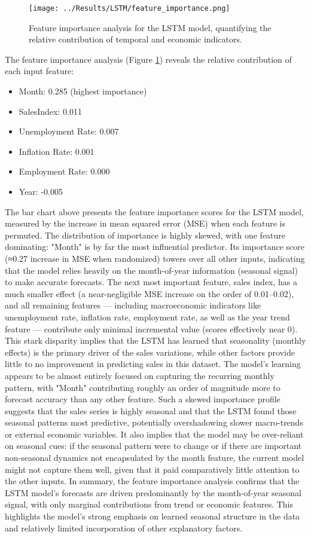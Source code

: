 \documentclass[12pt,a4paper]{report}
\begin{document}
\begin{figure}[htbp]
\centering
\texttt{[image: ../Results/LSTM/feature\_importance.png]}
\caption{Feature importance analysis for the LSTM model, quantifying the relative contribution of temporal and economic indicators.}
\label{fig:feature_importance}
\end{figure}

The feature importance analysis (Figure \ref{fig:feature_importance}) reveals the relative contribution of each input feature:
\begin{itemize}
    \item Month: 0.285 (highest importance)
    \item SalesIndex: 0.011
    \item Unemployment Rate: 0.007
    \item Inflation Rate: 0.001
    \item Employment Rate: 0.000
    \item Year: -0.005
\end{itemize}

The bar chart above presents the feature importance scores for the LSTM model, measured by the increase in mean squared error (MSE) when each feature is permuted. The distribution of importance is highly skewed, with one feature dominating: "Month" is by far the most influential predictor. Its importance score (≈0.27 increase in MSE when randomized) towers over all other inputs, indicating that the model relies heavily on the month-of-year information (seasonal signal) to make accurate forecasts. The next most important feature, sales index, has a much smaller effect (a near-negligible MSE increase on the order of 0.01–0.02), and all remaining features — including macroeconomic indicators like unemployment rate, inflation rate, employment rate, as well as the year trend feature — contribute only minimal incremental value (scores effectively near 0). This stark disparity implies that the LSTM has learned that seasonality (monthly effects) is the primary driver of the sales variations, while other factors provide little to no improvement in predicting sales in this dataset. The model's learning appears to be almost entirely focused on capturing the recurring monthly pattern, with "Month" contributing roughly an order of magnitude more to forecast accuracy than any other feature. Such a skewed importance profile suggests that the sales series is highly seasonal and that the LSTM found those seasonal patterns most predictive, potentially overshadowing slower macro-trends or external economic variables. It also implies that the model may be over-reliant on seasonal cues: if the seasonal pattern were to change or if there are important non-seasonal dynamics not encapsulated by the month feature, the current model might not capture them well, given that it paid comparatively little attention to the other inputs. In summary, the feature importance analysis confirms that the LSTM model's forecasts are driven predominantly by the month-of-year seasonal signal, with only marginal contributions from trend or economic features. This highlights the model's strong emphasis on learned seasonal structure in the data and relatively limited incorporation of other explanatory factors.
\end{document}
